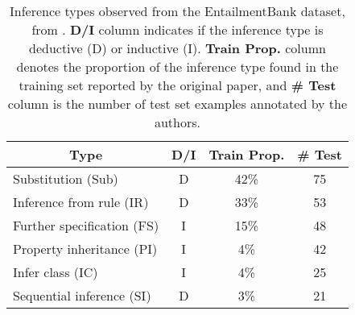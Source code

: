 \begin{table}[t]
    \small
    \centering
    \begin{tabular}{l|c|c|c}
         \multicolumn{1}{c|}{Type} & D/I & Train Prop. & \# Test  \\
         \hline \hline
         Substitution (Sub) & D & 42\% & 75 \\
         Inference from rule (IR) & D & 33\% & 53 \\
         Further specification (FS) & I & 15\% & 48 \\
         Property inheritance (PI) & I & 4\% & 42 \\
         Infer class (IC) & I & 4\% & 25 \\
         Sequential inference (SI) & D & 3\% & 21 \\
    \end{tabular}
    \caption{Inference types observed from the EntailmentBank dataset, from \citet{entailmentbank}. \textbf{D/I} column indicates if the inference type is deductive (D) or inductive (I). \textbf{Train Prop.} column denotes the proportion of the inference type found in the training set reported by the original paper, and \textbf{\# Test} column is the number of test set examples annotated by the authors.}
\label{tab:inference-types}
\end{table}